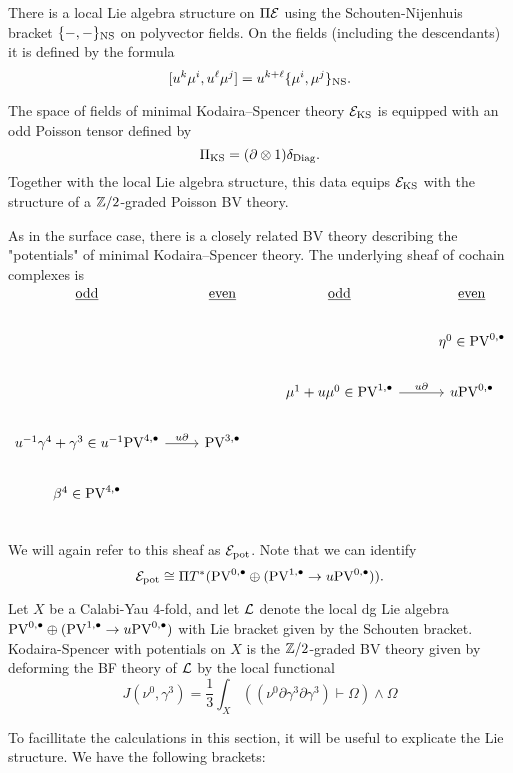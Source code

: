 \documentclass[11pt]{amsart}
\def\PV{{\rm PV}}
\begin{document}
There is a local Lie algebra structure on $\Pi\mathcal E$ using the Schouten-Nijenhuis bracket $\{-,-\}_{\rm NS}$ on polyvector fields.
On the fields (including the descendants) it is defined by the formula
\[
[u^k \mu^i , u^\ell \mu^j] = u^{k+\ell} \{\mu^i, \mu^j\}_{\rm NS}.
\]

The space of fields of minimal Kodaira--Spencer theory $\mathcal E_{\rm KS}$ is equipped with an odd Poisson tensor defined by
\[
\Pi_{\rm KS} = (\partial \otimes 1) \delta_{\rm Diag} .
\]
Together with the local Lie algebra structure, this data equips $\mathcal E_{\rm KS}$ with the structure of a $\mathbb Z/2$-graded Poisson BV theory.

As in the surface case, there is a closely related BV theory describing the "potentials" of minimal Kodaira--Spencer theory. The underlying sheaf of cochain complexes is
\[
\begin{tikzcd}
\ul{\rm odd} & \ul{\rm even} & \ul{\rm odd} & \ul{\rm even} \\
& & & \eta^{0}\in\PV^{0,\bu} \\
& & \mu^{1}+u\mu^{0}\in\PV^{1,\bu} \ar[r, "u \partial"] & u \PV^{0,\bu} \\
u^{-1} \gamma^4 + \gamma^3  \in u^{-1} \PV^{4,\bu} \ar[r, "u \partial"] & \PV^{3,\bu} & &  \\
\beta^{4} \in\PV^{4,\bu} &  &  & \\
\end{tikzcd}
\]
We will again refer to this sheaf as $\mathcal E_{\rm pot}$. Note that we can identify \[\cE_{\rm pot}\cong \Pi T^{*}(\PV^{0,\bu}\oplus (\PV^{1,\bu}\to u\PV^{0,\bu})).\]

\begin{dfn}
  Let $X$ be a Calabi-Yau 4-fold, and let $\mathcal L$ denote the local dg Lie algebra $\PV^{0,\bu}\oplus (\PV^{1,\bu}\to u\PV^{0,\bu})$ with Lie bracket given by the Schouten bracket. Kodaira-Spencer with potentials on $X$ is the $\mathbb Z/2$-graded BV theory given by deforming the BF theory of $\mathcal L$ by the local functional \[ J(\nu^{0}, \gamma^{3})=\frac{1}{3}\int_{X}\left((\nu^{0}\partial\gamma^{3}\partial\gamma^{3})\vdash\Omega\right) \wedge \Omega\]\end{dfn}

To facillitate the calculations in this section, it will be useful to explicate the Lie structure. We have the following brackets:
\end{document}

